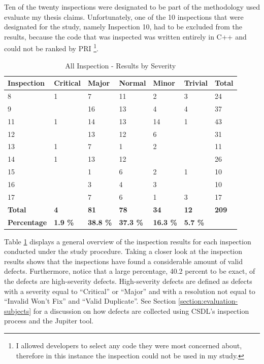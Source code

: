 
Ten of the twenty inspections were designated to be part of the methodology
used evaluate my thesis claims. Unfortunately, one of the 10 inspections
that were designated for the study, namely Inspection 10, had to be
excluded from the results, because the code that was inspected was written
entirely in C++ and could not be ranked by PRI \footnote{I allowed
  developers to select any code they were most concerned about, therefore
  in this instance the inspection could not be used in my study.}.

\begin{table}[!h]
  \begin{center}
    \caption{All Inspection - Results by Severity}
    \label{tab:inspection-results}
    \begin{tabular}{|p{2.0cm}|p{1.5cm}|p{1.5cm}|p{1.5cm}|p{1.5cm}|p{1.5cm}|p{1.5cm}|} \hline
{\bf Inspection} & {\bf Critical} & {\bf Major} 
& {\bf Normal} & {\bf Minor} & {\bf Trivial} & {\bf Total} \\ \hline
 8 & 1 & 7 & 11& 2 & 3 & 24 \\ \hline
 9 &   & 16& 13& 4 & 4 & 37 \\ \hline
11 & 1 & 14& 13& 14& 1 & 43 \\ \hline
12 &   & 13& 12& 6 &   & 31 \\ \hline
13 & 1 & 7 & 1 & 2 &   & 11 \\ \hline
14 & 1 & 13& 12&   &   & 26 \\ \hline
15 &   & 1 & 6 & 2 & 1 & 10 \\ \hline
16 &   & 3 & 4 & 3 &   & 10 \\ \hline
17 &   & 7 & 6 & 1 & 3 & 17 \\ \hline
{\bf Total} & {\bf 4} & {\bf 81} & {\bf 78} & {\bf 34} & {\bf 12} & {\bf
  209} \\ \hline
{\bf Percentage} & {\bf 1.9 \%} & {\bf 38.8 \%} & {\bf 37.3 \%} & {\bf 16.3 
  \%} & {\bf 5.7 \%} &  \\ \hline 
    \end{tabular}
  \end{center}
\end{table}

Table \ref{tab:inspection-results} displays a general overview of the
inspection results for each inspection conducted under the study procedure.
Taking a closer look at the inspection results shows that the inspections
have found a considerable amount of valid defects. Furthermore, notice that
a large percentage, 40.2 percent to be exact, of the defects are
high-severity defects. High-severity defects are defined as defects with a
severity equal to ``Critical'' or ``Major'' and with a resolution not equal
to ``Invalid Won't Fix'' and ``Valid Duplicate''. See Section
\ref{section:evaluation-subjects} for a discussion on how defects are
collected using CSDL's inspection process and the Jupiter tool.

